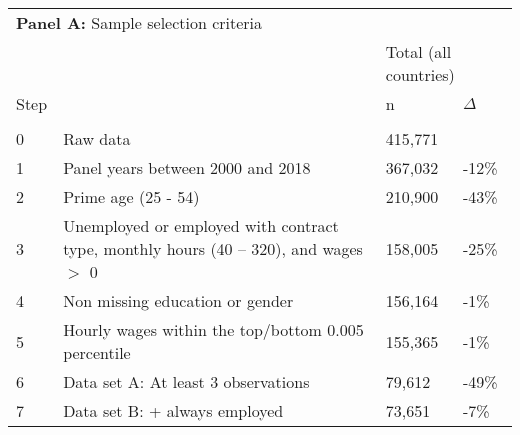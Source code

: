 \begin{tabular}{l>{\raggedright\arraybackslash}p{4in}ll}
   \toprule 
 
\multicolumn{4}{l}{{\bf Panel A:} Sample selection criteria} \\ 

&  & 
\multicolumn{2}{l}{Total (all countries)}
\\  
 
 
\multicolumn{1}{l}{Step} & 
\multicolumn{1}{l}{Description} 
& n & $\Delta$
\\ 
\cmidrule(lr){1-2}
\cmidrule(lr){3-4}
\\[-1.8ex]  
 
0 & Raw data & 415,771 &  \\ 
  1 & Panel years between 2000 and 2018 & 367,032 & -12\% \\ 
  2 & Prime age (25 - 54) & 210,900 & -43\% \\ 
  3 & Unemployed or employed with contract type, monthly hours (40 -- 320), and wages $>$ 0 & 158,005 & -25\% \\ 
  4 & Non missing education or gender & 156,164 & -1\% \\ 
  5 & Hourly wages within the top/bottom 0.005 percentile & 155,365 & -1\% \\ 
  6 & Data set A: At least 3 observations & 79,612 & -49\% \\ 
  7 & Data set B: + always employed & 73,651 & -7\% \\ 
   \bottomrule 
\end{tabular}
